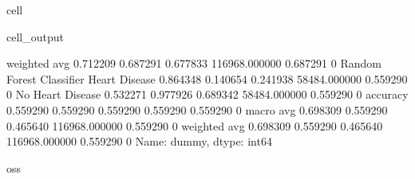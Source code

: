 \documentclass[letterpaper,10pt,english]{jupyterBook}
\begin{document}
\begin{sphinxuseclass}{cell}
\begin{sphinxVerbatimOutput}
\begin{sphinxuseclass}{cell_output}
\begin{sphinxVerbatim}[commandchars=\\\{\}]
                           weighted avg      0.712209   0.687291  0.677833  116968.000000  0.687291    0
Random Forest Classifier   Heart Disease     0.864348   0.140654  0.241938  58484.000000   0.559290    0
                           No Heart Disease  0.532271   0.977926  0.689342  58484.000000   0.559290    0
                           accuracy          0.559290   0.559290  0.559290  0.559290       0.559290    0
                           macro avg         0.698309   0.559290  0.465640  116968.000000  0.559290    0
                           weighted avg      0.698309   0.559290  0.465640  116968.000000  0.559290    0
Name: dummy, dtype: int64

oss
\PYGZhy{}\PYGZhy{}\PYGZhy{}\PYGZhy{}\PYGZhy{}\PYGZhy{}\PYGZhy{}\PYGZhy{}\PYGZhy{}\PYGZhy{}\PYGZhy{}\PYGZhy{}\PYGZhy{}\PYGZhy{}\PYGZhy{}\PYGZhy{}\PYGZhy{}\PYGZhy{}\PYGZhy{}
\end{sphinxVerbatim}

\noindent{}


\end{sphinxuseclass}
\end{sphinxVerbatimOutput}
\end{sphinxuseclass}
\end{document}
